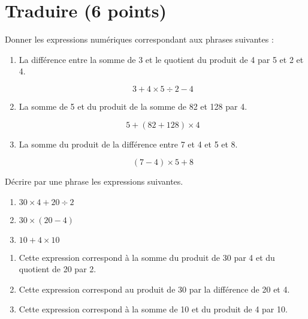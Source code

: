 \section{Traduire (6 points)}

\begin{questions}
	\question[3] Donner les expressions numériques correspondant aux phrases suivantes :
	
	\begin{enumerate}
		\item La différence entre la somme de 3 et le quotient du produit de 4 par 5 et 2 et 4.
		
		\begin{solution}
			\begin{equation*}
				3 + 4 \times 5 \div 2 - 4
			\end{equation*}
		\end{solution}
		
		\item La somme de 5 et du produit de la somme de 82 et 128 par 4.
		\begin{solution}
			\begin{equation*}
				5 + (82 + 128) \times 4
			\end{equation*}
		\end{solution}
	
		\item La somme du produit de la différence entre 7 et 4 et 5 et 8. 
		\begin{solution}
			\begin{equation*}
				(7 - 4) \times 5 + 8
			\end{equation*}
		\end{solution}
	\end{enumerate}
	\question[3] Décrire par une phrase les expressions suivantes.
	
	\begin{multicols}{3}
		\begin{enumerate}
			\item $30 \times 4 + 20 \div 2$
			\item $30 \times (20 - 4)$
			\item $10 + 4 \times 10$
		\end{enumerate}
	\end{multicols}	

	
	\begin{solution}
		\begin{multicols}{2}
			\begin{enumerate}
				\item Cette expression correspond à la somme du produit de 30 par 4 et du quotient de 20 par 2.
					
				\item Cette expression correspond au produit de 30 par la différence de 20 et 4.
				
				\item Cette expression correspond à la somme de 10 et du produit de 4 par 10.
			\end{enumerate}
		
		\end{multicols}
	\end{solution}
	
\end{questions}

